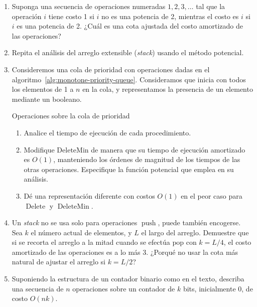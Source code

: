 \begin{enumerate}
\item
  Suponga una secuencia de operaciones numeradas \(1, 2, 3, \dotsc\)
  tal que la operación \(i\) tiene costo \num{1}
  si \(i\) no es una potencia de \num{2},
  mientras el costo es \(i\) si \(i\) es una potencia de \num{2}.
  ¿Cuál es una cota ajustada del costo amortizado de las operaciones?
\item
  Repita el análisis del arreglo extensible
  (\emph{\foreignlanguage{english}{stack}})
  usando el método potencial.
\item
  Consideremos una cola de prioridad con operaciones
  dadas en el algoritmo~\ref{alg:monotone-priority-queue}.
  Consideramos que inicia con todos los elementos de \num{1} a \(n\)
  en la cola,
  y representamos la presencia de un elemento mediante un booleano.
  \begin{algorithm}[ht]
    \DontPrintSemicolon\Indp

    \BlankLine
    \BlankLine
    \caption{Operaciones sobre la cola de prioridad}
    \label{alg:monotone-priority-queue}
  \end{algorithm}
  \begin{enumerate}
  \item
    Analice el tiempo de ejecución de cada procedimiento.
  \item
    Modifique \(\mathrm{DeleteMin}\)
    de manera que su tiempo de ejecución amortizado es \(O(1)\),
    manteniendo los órdenes de magnitud
    de los tiempos de las otras operaciones.
    Especifique la función potencial que emplea en su análisis.
  \item
    Dé una representación diferente
    con costos \(O(1)\) en el peor caso
    para \(\operatorname{Delete}\) y \(\operatorname{DeleteMin}\).
  \end{enumerate}
\item
  Un \emph{\foreignlanguage{english}{stack}}
  no se usa solo para operaciones \(\operatorname{push}\),
  puede también encogerse.
  Sea \(k\) el número actual de elementos,
  y \(L\) el largo del arreglo.
  Demuestre que si se recorta el arreglo a la mitad
  cuando se efectúa \(\mathrm{pop}\) con \(k = L / 4\),
  el costo amortizado de las operaciones es a lo más \num{3}.
  ¿Porqué no usar la cota más natural de ajustar el arreglo si \(k = L / 2\)?
\item
  Suponiendo la estructura de un contador binario como en el texto,
  describa una secuencia de \(n\) operaciones
  sobre un contador de \(k\) bits,
  inicialmente \num{0},
  de costo \(O(n k)\).


\end{enumerate}
